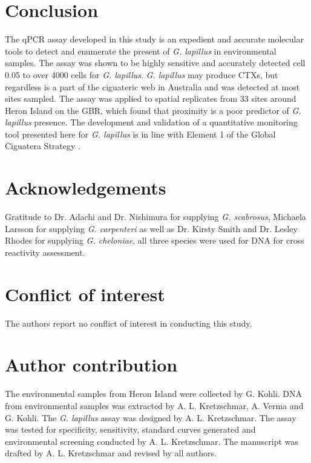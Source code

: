 \documentclass[12pt]{article}
\begin{document}
\section*{Conclusion}
The qPCR assay developed in this study is an expedient and accurate molecular tools to detect and enumerate the present of \emph{G. lapillus} %
in environmental samples. 
The assay was shown to be highly sensitive and accurately detected cell 0.05 to over 4000 cells for \emph{G. lapillus}. %
\emph{G. lapillus} may produce CTXs, but regardless is a part of the ciguateric web in Australia and was detected at most sites sampled.
The assay was applied to spatial replicates from 33 sites around Heron Island on the GBR, which found that proximity is a poor predictor of \textit{G. lapillus} presence. 
The development and validation of a quantitative monitoring tool presented here for \textit{G. lapillus} is in line with Element 1 of the Global Ciguatera Strategy \cite{globalcig}.

 \section*{Acknowledgements}
Gratitude to Dr. Adachi and Dr. Nishimura for supplying \emph{G. scabrosus}, Michaela Larsson for supplying \emph{G. carpenteri} as well as Dr. Kirsty Smith and Dr. Lesley Rhodes for supplying \emph{G. cheloniae}, all three species were used for DNA for cross reactivity assessment. 

\section*{Conflict of interest}
The authors report no conflict of interest in conducting this study.

\section*{Author contribution}
The environmental samples from Heron Island were collected by G. Kohli. 
DNA from environmental samples was extracted by A. L. Kretzschmar, A. Verma and G. Kohli. %
The \emph{G. lapillus} assay was designed by A. L. Kretzschmar. 
The assay was tested for specificity, sensitivity, standard curves generated and environmental screening conducted by A. L. Kretzschmar. 
The manuscript was drafted by A. L. Kretzschmar and revised by all authors.

\FloatBarrier
\newpage
%
%


\end{document}
